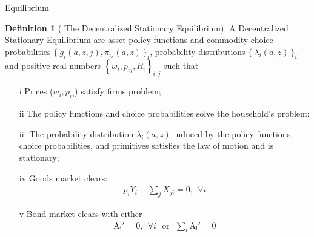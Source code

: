 \documentclass[9pt,pdftex,aspectratio=1610]{beamer}
\theoremstyle{definition}
\newtheorem{df}{Definition}
\begin{document}
\begin{frame}[t]{Equilibrium}
\vspace{-.25cm}
\smallskip
{\small
\begin{df}[ {\normalsize The Decentralized Stationary Equilibrium}] \normalfont A Decentralized Stationary Equilibrium are asset policy functions and commodity choice probabilities $\{\  g_{i}(a, z, j), \pi_{ij}(a, z) \ \}_{i}$, probability distributions $\{ \ \lambda_i(a, z) \ \}_{i}$ and positive real numbers $\left \{w_i, p_{ij}, R_i\right \}_{i,j}$ such that
\begin{itemize}
\item[i]  Prices ($w_i, p_{ij}$) satisfy firms problem;
\item[ii] The policy functions and choice probabilities solve the household's problem;
\item[iii] The probability distribution $\lambda_i(a, z)$ induced by the policy functions, choice probabilities, and primitives satisfies the law of motion and is stationary;
\item[iv] Goods market clears:
\begin{align*}
p_{i} Y_{i} - \sum_{j}  X_{ji} = 0, \ \ \forall i
\end{align*}
\item[v] Bond market clears with either
\begin{align*}
\mathrm{A_i'} = 0, \ \ \forall i \ \ \ \mbox{or} \ \ \ \sum_{i}\mathrm{A_i'} = 0
\end{align*}
\end{itemize}
\end{df}
}
\end{frame}

\end{document}

